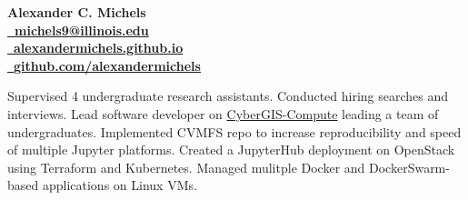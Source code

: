 \documentclass{acmresume}
\begin{document}
	
	\begin{multicols}{2}
		\vspace*{.1cm}
		\textbf{\huge Alexander C. Michels}\\ \columnbreak
        \hfill\href{mailto:michels9@illinois.edu}{\textbf{\faEnvelope~michels9@illinois.edu}} \\
        \hfill\href{http://alexandermichels.github.io}{\faGlobeAmericas~\textbf{alexandermichels.github.io}} \\
        \hfill\href{https://github.com/alexandermichels}{\faGithub~\textbf{github.com/alexandermichels}}
	\end{multicols}
	
	
		
		
	

	
        \begin{titemize}
            \titem Supervised 4 undergraduate research assistants. Conducted hiring searches and interviews.
            \titem Lead software developer on \href{https://github.com/cybergis/cybergis-compute-python-sdk}{CyberGIS-Compute} leading a team of undergraduates.
        	\titem Implemented CVMFS repo to increase reproducibility and speed of multiple Jupyter platforms.
            \titem Created a JupyterHub deployment on OpenStack using Terraform and Kubernetes.
            \titem Managed mulitple Docker and DockerSwarm-based applications on Linux  VMs.
        \end{titemize}

        \begin{titemize}
        \end{titemize}
		
\end{document}
